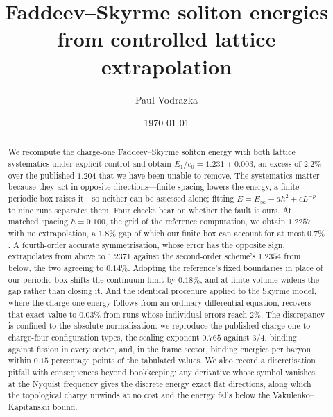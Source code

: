 \documentclass[aps,prd,preprint,nofootinbib,longbibliography]{revtex4-2}
\begin{document}
\title{Faddeev--Skyrme soliton energies\texorpdfstring{\\}{} from controlled lattice extrapolation}

\author{Paul Vodrazka}
\date{\today}

\begin{abstract}
We recompute the charge-one Faddeev--Skyrme soliton energy with both lattice
systematics under explicit control and obtain $E_1/c_0=1.231\pm0.003$, an excess
of $2.2\%$ over the published $1.204$ that we have been unable to remove. The
systematics matter because they act in opposite directions---finite spacing
lowers the energy, a finite periodic box raises it---so neither can be assessed
alone; fitting $E=E_\infty-ah^2+cL^{-p}$ to nine runs separates them. Four
checks bear on whether the fault is ours. At matched spacing $h=0.100$, the grid
of the reference computation, we obtain $1.2257$ with no extrapolation, a
$1.8\%$ gap of which our finite box can account for at most $0.7\%$. A
fourth-order accurate symmetrisation, whose error has the opposite sign,
extrapolates from above to $1.2371$ against the second-order scheme's $1.2354$
from below, the two agreeing to $0.14\%$. Adopting the reference's fixed
boundaries in place of our periodic box shifts the continuum limit by $0.18\%$,
and at finite volume widens the gap rather than closing it. And the identical
procedure applied to
the Skyrme model, where the charge-one energy follows from an ordinary
differential equation, recovers that exact value to $0.03\%$ from runs whose
individual errors reach $2\%$. The discrepancy is confined to the absolute
normalisation: we reproduce the published charge-one to charge-four
configuration types, the scaling exponent $0.765$ against $3/4$, binding against
fission in every sector, and, in the frame sector, binding energies per baryon
within $0.15$ percentage points of the tabulated values. We also record a
discretisation pitfall with consequences beyond bookkeeping: any derivative
whose symbol vanishes at the Nyquist frequency gives the discrete energy exact
flat directions, along which the topological charge unwinds at no cost and the
energy falls below the Vakulenko--Kapitanskii bound.
\end{abstract}

\maketitle
\end{document}
